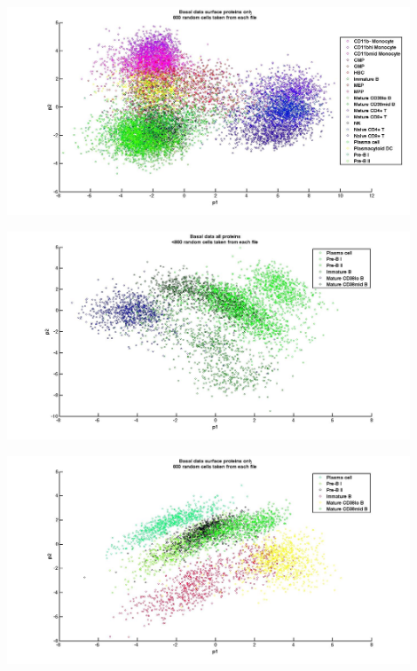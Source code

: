\documentclass{article} %
\begin{document}
\begin{minipage}{\linewidth}
\centering
  \includegraphics[width=120mm]{Basal_SurfaceProtein_AllCells.jpg}
\end{minipage}

\begin{minipage}{\linewidth}
\centering
  \includegraphics[width=120mm]{Basal_AllProtein_BCells.jpg}
\end{minipage}

\begin{minipage}{\linewidth}
\centering
  \includegraphics[width=120mm]{Basal_SurfaceProtein_BCells.jpg}
\end{minipage}
\end{document}
